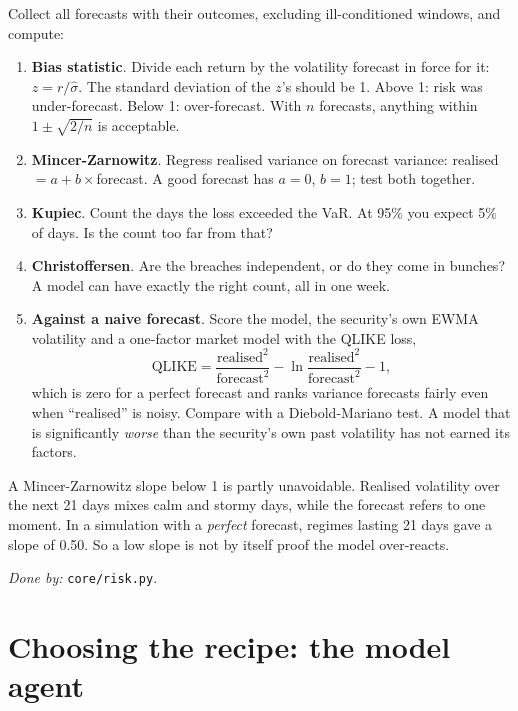 \documentclass[11pt,a4paper]{article}
\newcommand{\doneby}[1]{\par{\raggedright\small\textit{Done by:} #1\par}}
\begin{document}
\begin{method}
Collect all forecasts with their outcomes, excluding ill-conditioned windows, and compute:
\begin{enumerate}[leftmargin=1.4em]
  \item \textbf{Bias statistic}. Divide each return by the volatility forecast in force for it: $z = r/\hat\sigma$. The standard deviation of the $z$'s should be 1. Above 1: risk was under-forecast. Below 1: over-forecast. With $n$ forecasts, anything within $1\pm\sqrt{2/n}$ is acceptable.
  \item \textbf{Mincer-Zarnowitz}. Regress realised variance on forecast variance: realised $= a + b\times$forecast. A good forecast has $a=0$, $b=1$; test both together.
  \item \textbf{Kupiec}. Count the days the loss exceeded the VaR. At 95\% you expect 5\% of days. Is the count too far from that?
  \item \textbf{Christoffersen}. Are the breaches independent, or do they come in bunches? A model can have exactly the right count, all in one week.
  \item \textbf{Against a naive forecast}. Score the model, the security's own EWMA volatility and a one-factor market model with the QLIKE loss,
  \[
    \text{QLIKE} = \frac{\text{realised}^2}{\text{forecast}^2} - \ln\frac{\text{realised}^2}{\text{forecast}^2} - 1,
  \]
  which is zero for a perfect forecast and ranks variance forecasts fairly even when ``realised'' is noisy. Compare with a Diebold-Mariano test. A model that is significantly \emph{worse} than the security's own past volatility has not earned its factors.
\end{enumerate}
\end{method}

\begin{warn}
A Mincer-Zarnowitz slope below 1 is partly unavoidable. Realised volatility over the
next 21 days mixes calm and stormy days, while the forecast refers to one moment. In
a simulation with a \emph{perfect} forecast, regimes lasting 21 days gave a slope of
0.50. So a low slope is not by itself proof the model over-reacts.
\end{warn}

\doneby{\texttt{core/risk.py}.}

\section{Choosing the recipe: the model agent}\label{part:agent}
\end{document}
